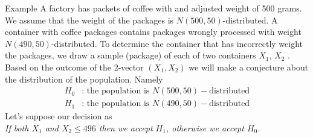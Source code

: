 \documentclass{beamer}
\begin{document}
\begin{frame}{Example}
	A factory has packets of coffee with and adjusted weight of 500 grams. We assume that the weight of the packages is $N(500,50)$-distributed. A container with coffee packages contains packages wrongly processed with weight $N(490,50)$-distributed. To determine the container that has incorrectly weight the packages, we draw a sample (package) of each of two containers $X_1$, $X_2$ . Based on the outcome of the 2-vector $(X_1,X_2)$ we will make a conjecture about the distribution of the population. Namely
	\begin{equation*}
		\begin{split}
			H_0 & \text{: the population is } N(500,50)-\text{distributed}\\
			H_1 & \text{: the population is } N(490,50)-\text{distributed}
		\end{split}
	\end{equation*}
	Let's suppose our decision as\\
	\textit{If both $X_1$ and $X_2 \le 496$ then we accept $H_1$, otherwise we accept $H_0$. }
\end{frame}
\end{document}

